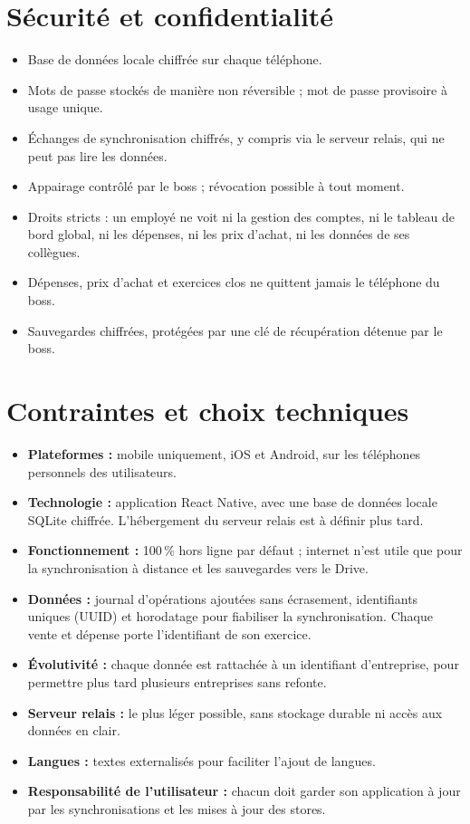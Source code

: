 \documentclass[11pt,a4paper]{article}
\begin{document}
	\section{Sécurité et confidentialité}
	\begin{itemize}[leftmargin=*]
		\item Base de données locale chiffrée sur chaque téléphone.
		\item Mots de passe stockés de manière non réversible ; mot de passe provisoire à usage unique.
		\item Échanges de synchronisation chiffrés, y compris via le serveur relais, qui ne peut pas lire les données.
		\item Appairage contrôlé par le boss ; révocation possible à tout moment.
		\item Droits stricts : un employé ne voit ni la gestion des comptes, ni le tableau de bord global, ni les dépenses, ni les prix d'achat, ni les données de ses collègues.
		\item Dépenses, prix d'achat et exercices clos ne quittent jamais le téléphone du boss.
		\item Sauvegardes chiffrées, protégées par une clé de récupération détenue par le boss.
	\end{itemize}
	
	\section{Contraintes et choix techniques}
	\begin{itemize}[leftmargin=*]
		\item \textbf{Plateformes :} mobile uniquement, iOS et Android, sur les téléphones personnels des utilisateurs.
		\item \textbf{Technologie :} application React Native, avec une base de données locale SQLite chiffrée. L'hébergement du serveur relais est à définir plus tard.
		\item \textbf{Fonctionnement :} 100\,\% hors ligne par défaut ; internet n'est utile que pour la synchronisation à distance et les sauvegardes vers le Drive.
		\item \textbf{Données :} journal d'opérations ajoutées sans écrasement, identifiants uniques (UUID) et horodatage pour fiabiliser la synchronisation. Chaque vente et dépense porte l'identifiant de son exercice.
		\item \textbf{Évolutivité :} chaque donnée est rattachée à un identifiant d'entreprise, pour permettre plus tard plusieurs entreprises sans refonte.
		\item \textbf{Serveur relais :} le plus léger possible, sans stockage durable ni accès aux données en clair.
		\item \textbf{Langues :} textes externalisés pour faciliter l'ajout de langues.
		\item \textbf{Responsabilité de l'utilisateur :} chacun doit garder son application à jour par les synchronisations et les mises à jour des stores.
	\end{itemize}
	
\end{document}
